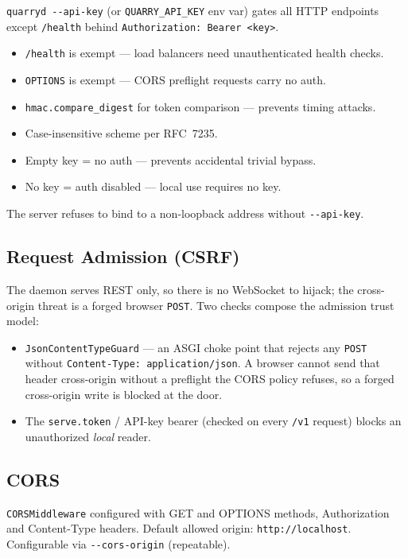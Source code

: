 \documentclass[a4paper,10pt]{article}
\begin{document}
\texttt{quarryd -{}-api-key} (or \texttt{QUARRY\_API\_KEY} env var)
gates all HTTP endpoints except \texttt{/health} behind
\texttt{Authorization: Bearer <key>}.

\begin{itemize}
  \item \texttt{/health} is exempt --- load balancers need
    unauthenticated health checks.
  \item \texttt{OPTIONS} is exempt --- CORS preflight requests carry
    no auth.
  \item \texttt{hmac.compare\_digest} for token comparison ---
    prevents timing attacks.
  \item Case-insensitive scheme per RFC~7235.
  \item Empty key = no auth --- prevents accidental trivial bypass.
  \item No key = auth disabled --- local use requires no key.
\end{itemize}

The server refuses to bind to a non-loopback address without
\texttt{-{}-api-key}.

\subsection{Request Admission (CSRF)}

The daemon serves REST only, so there is no WebSocket to hijack; the
cross-origin threat is a forged browser \texttt{POST}.  Two checks
compose the admission trust model:

\begin{itemize}
  \item \texttt{JsonContentTypeGuard} --- an ASGI choke point that
    rejects any \texttt{POST} without \texttt{Content-Type:
    application/json}.  A browser cannot send that header cross-origin
    without a preflight the CORS policy refuses, so a forged
    cross-origin write is blocked at the door.
  \item The \texttt{serve.token} / API-key bearer (checked on every
    \texttt{/v1} request) blocks an unauthorized \emph{local} reader.
\end{itemize}

\subsection{CORS}

\texttt{CORSMiddleware} configured with GET and OPTIONS methods,
Authorization and Content-Type headers.  Default allowed origin:
\texttt{http://localhost}.  Configurable via \texttt{-{}-cors-origin}
(repeatable).
\end{document}
